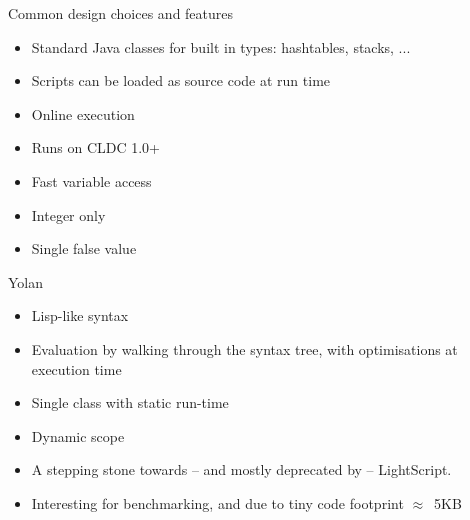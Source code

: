 \documentclass[a4paper,landscape]{slides}
\begin{document}
\begin{slide}
	{\large Common design choices and features \\ \mbox{}}
	\begin{itemize} 
\setlength{\itemsep}{3mm}
            \item Standard Java classes for built in types: hashtables, stacks, ...
            \item Scripts can be loaded as source code at run time
            \item Online execution
            \item Runs on CLDC 1.0+
            \item Fast variable access
            \item Integer only
            \item Single false value
        \end{itemize}
\end{slide}

\begin{slide}
	{\large Yolan \\ \mbox{} }
	\begin{itemize} 
\setlength{\itemsep}{3mm}
            \item Lisp-like syntax 
            \item Evaluation by walking through the syntax tree, with optimisations at execution time
            \item Single class with static run-time
            \item Dynamic scope
            \item A stepping stone towards -- and mostly deprecated by -- LightScript. 
            \item Interesting for benchmarking, and due to tiny code footprint $\approx$~5KB
	\end{itemize}
\end{slide}
\end{document}
